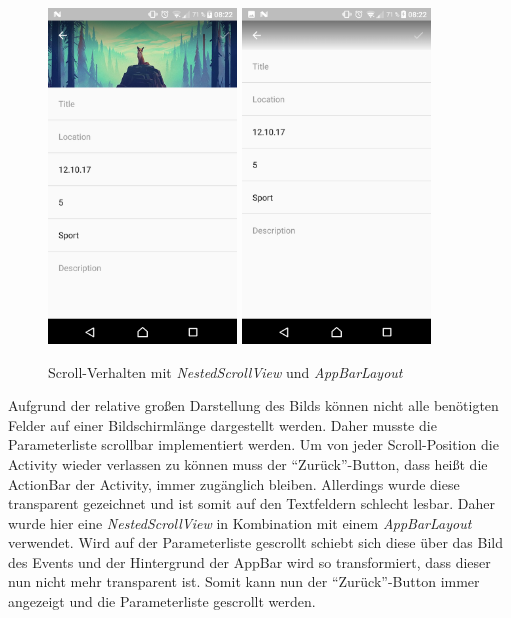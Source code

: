 \documentclass{scrartcl}
\begin{document}
\begin{figure}[h!tbp]
  \centering
  \includegraphics[width=5cm]{img/addevent_2}
  \hspace{1cm}
  \includegraphics[width=5cm]{img/addevent_3}
  \caption{Scroll-Verhalten mit \emph{NestedScrollView} und \emph{AppBarLayout}}
\end{figure}

Aufgrund der relative großen Darstellung des Bilds können nicht alle benötigten
Felder auf einer Bildschirmlänge dargestellt werden. Daher musste die
Parameterliste scrollbar implementiert werden. Um von jeder Scroll-Position die
Activity wieder verlassen zu können muss der \enquote{Zurück}-Button, dass heißt
die ActionBar der Activity, immer zugänglich bleiben. Allerdings wurde diese
transparent gezeichnet und ist somit auf den Textfeldern schlecht lesbar. Daher
wurde hier eine \emph{NestedScrollView} in Kombination mit einem
\emph{AppBarLayout} verwendet. Wird auf der Parameterliste gescrollt schiebt
sich diese über das Bild des Events und der Hintergrund der AppBar wird so
transformiert, dass dieser nun nicht mehr transparent ist. Somit kann nun der
\enquote{Zurück}-Button immer angezeigt und die Parameterliste gescrollt werden.
\end{document}
